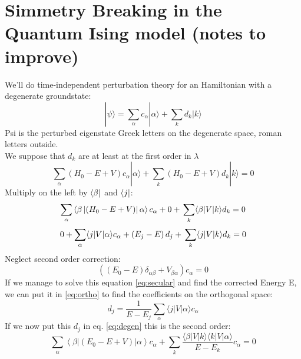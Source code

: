 \documentclass[12pt,a4paper]{article}
\begin{document}
\section{Simmetry Breaking in the Quantum Ising model (notes to improve)}
We'll do time-independent perturbation theory for an Hamiltonian with a degenerate groundstate:
\begin{equation}
	|\psi\rangle=\sum_{\alpha} c_{\alpha}|\alpha\rangle+\sum_{k} d_{k}|k\rangle
\end{equation}
Psi is the perturbed eigenstate Greek letters on the degenerate space, roman letters outside.\\
We suppose that $d_k$ are at least at the first order in $\lambda$
\begin{equation}
	\sum_{\alpha}\left(H_{0}-E+V\right) c_{\alpha}|\alpha\rangle+\sum_{k}\left(H_{0}-E+V\right) d_{k}|k\rangle=0
\end{equation}
Multiply on the left by $\bra{\beta}$ and $\bra{j}$:
\begin{equation}\label{eq:degen}
		\sum_{\alpha}\left\langle\beta\left|\left(H_{0}-E+V\right)\right| \alpha\right\rangle c_{\alpha}+0+ \\
		\sum_{k}\langle\beta|V| k\rangle d_{k}=0
\end{equation}
\begin{equation}\label{eq:ortho}
		0+\sum_{\alpha}\langle j|V| \alpha\rangle c_{\alpha}+\left(E_{j}-E\right) d_{j}+ \\
		\sum_{k}\langle j|V| k\rangle d_{k}=0
\end{equation}
Neglect second order correction:
\begin{equation}\label{eq:secular}
	\left(\left(E_{0}-E\right) \delta_{\alpha \beta}+V_{\beta \alpha}\right) c_{\alpha}=0
\end{equation}
If we manage to solve this equation  \ref{eq:secular} and find the corrected Energy E, we can put it in \ref{eq:ortho} to find the coefficients on the orthogonal space:
\begin{equation}\label{eq:correction}
	d_{j}=\frac{1}{E-E_{j}} \sum_{\alpha}\langle j|V| \alpha\rangle c_{\alpha}
\end{equation}
If we now put this $d_j$ in eq. \ref{eq:degen} this is the second order:
\begin{equation}
	\sum_{\alpha}\left\langle\beta\left|\left(E_{0}-E+V\right)\right| \alpha\right\rangle c_{\alpha}+\sum_{k} \frac{\langle\beta|V| k\rangle\langle k|V| \alpha\rangle}{E-E_{k}} c_{\alpha}=0
\end{equation}
\end{document}

